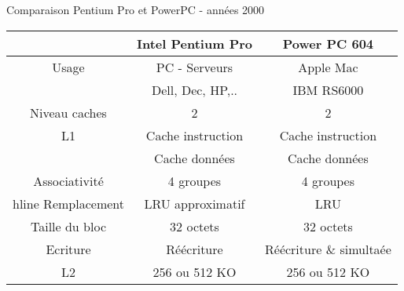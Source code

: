 %


\begin{Frame}{Comparaison Pentium Pro et PowerPC - années 2000}
  \begin{block}{}
    \begin{tabular}{|c|c|c |}\hline
      &Intel Pentium Pro& Power PC 604 \\\hline
Usage& PC - Serveurs & Apple Mac      \\
     & Dell, Dec, HP,.. & IBM RS6000\\      \hline
Niveau caches & 2 & 2 \\\hline
L1  & Cache instruction & Cache instruction\\      
    & Cache données & Cache données\\       \hline
Associativité & 4 groupes & 4 groupes \\ hline
Remplacement & LRU approximatif & LRU \\ \hline
Taille du bloc & 32 octets & 32 octets \\ \hline
Ecriture & Réécriture & Réécriture \& simultaée \\ \hline
L2 & 256 ou 512 KO &      256 ou 512 KO \\ \hline
    \end{tabular}
  \end{block}
\end{Frame}


